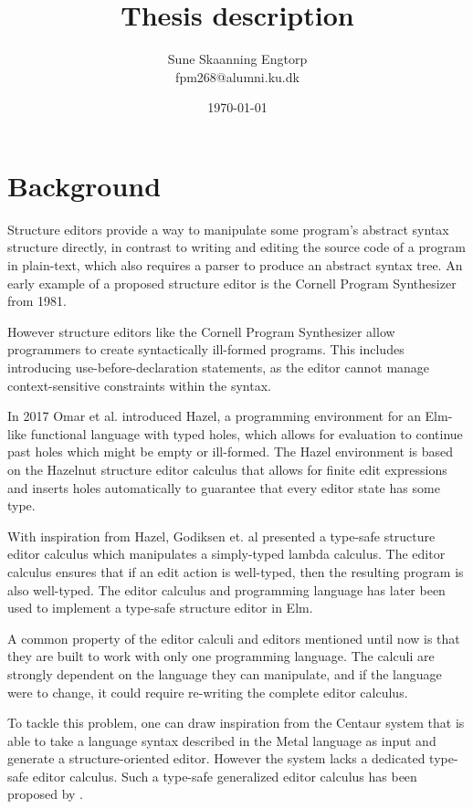 \documentclass{article}
\title{Thesis description}
\author{Sune Skaanning Engtorp \\ fpm268@alumni.ku.dk}
\date{\today}
\begin{document}
\maketitle

\section{Background}

Structure editors provide a way to manipulate some program's abstract syntax structure directly, in contrast to writing and editing the source code of a program in plain-text, which also requires a parser to produce an abstract syntax tree. An early example of a proposed structure editor is the Cornell Program Synthesizer\cite{cornell} from 1981.

However structure editors like the Cornell Program Synthesizer\cite{cornell} allow programmers to create syntactically ill-formed programs. This includes introducing use-before-declaration statements, as the editor cannot manage context-sensitive constraints within the syntax.

In 2017 Omar et al. introduced Hazel\cite{omar}, a programming environment for an Elm-like functional language with typed holes, which allows for evaluation to continue past holes which might be empty or ill-formed. The Hazel environment is based on the Hazelnut structure editor calculus that allows for finite edit expressions and inserts holes automatically to guarantee that every editor state has some type.

With inspiration from Hazel, Godiksen et. al \cite{godiksen} presented a type-safe structure editor calculus which manipulates a simply-typed lambda calculus. The editor calculus ensures that if an edit action is well-typed, then the resulting program is also well-typed. The editor calculus and programming language has later been used to implement a type-safe structure editor in Elm\cite{PAINT2023-missing ref}.

A common property of the editor calculi and editors mentioned until now is that they are built to work with only one programming language. The calculi are strongly dependent on the language they can manipulate, and if the language were to change, it could require re-writing the complete editor calculus.

To tackle this problem, one can draw inspiration from the Centaur system\cite{centaur} that is able to take a language syntax described in the Metal language as input and generate a structure-oriented editor. However the system lacks a dedicated type-safe editor calculus. Such a type-safe generalized editor calculus has been proposed by \cite{missing ref}.
\end{document}
